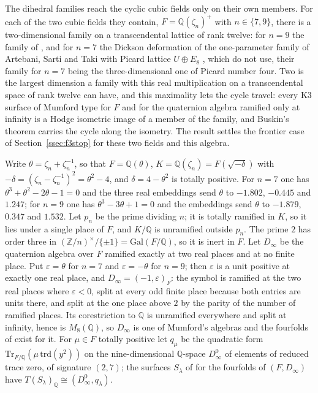 \documentclass[11pt,reqno]{amsart}
\numberwithin{equation}{section}
\theoremstyle{plain}
\theoremstyle{definition}
\newcommand{\QQ}{\mathbb{Q}}
\newcommand{\ZZ}{\mathbb{Z}}
\newcommand{\Gal}{\mathrm{Gal}}
\begin{document}
The dihedral families reach the cyclic cubic fields only on their own members. For each of the two cubic fields they contain, $F=\QQ(\zeta_{n})^{+}$ with $n\in\{7,9\}$, there is a two-dimensional family on a transcendental lattice of rank twelve: for $n=9$ the family of \cite[\S5.6]{vGS25}, and for $n=7$ the Dickson deformation of the one-parameter family of Artebani, Sarti and Taki with Picard lattice $U\oplus E_{8}$ \cite[Ex.~6.1]{AST11}, which \cite{vGS25} do not use, their family for $n=7$ being the three-dimensional one of Picard number four. Two is the largest dimension a family with this real multiplication on a transcendental space of rank twelve can have, and this maximality lets the cycle travel: every K3 surface of Mumford type for $F$ and for the quaternion algebra ramified only at infinity is a Hodge isometric image of a member of the family, and Buskin's theorem carries the cycle along the isometry. The result settles the frontier case of Section~\ref{ssec:f3stop} for these two fields and this algebra.

Write $\theta=\zeta_{n}+\zeta_{n}^{-1}$, so that $F=\QQ(\theta)$, $K=\QQ(\zeta_{n})=F(\sqrt{-\delta})$ with $-\delta=(\zeta_{n}-\zeta_{n}^{-1})^{2}=\theta^{2}-4$, and $\delta=4-\theta^{2}$ is totally positive. For $n=7$ one has $\theta^{3}+\theta^{2}-2\theta-1=0$ and the three real embeddings send $\theta$ to $-1.802$, $-0.445$ and $1.247$; for $n=9$ one has $\theta^{3}-3\theta+1=0$ and the embeddings send $\theta$ to $-1.879$, $0.347$ and $1.532$. Let $p_{n}$ be the prime dividing $n$; it is totally ramified in $K$, so it lies under a single place of $F$, and $K/\QQ$ is unramified outside $p_{n}$. The prime $2$ has order three in $(\ZZ/n)^{\times}/\{\pm1\}=\Gal(F/\QQ)$, so it is inert in $F$. Let $D_{\infty}$ be the quaternion algebra over $F$ ramified exactly at two real places and at no finite place. Put $\varepsilon=\theta$ for $n=7$ and $\varepsilon=-\theta$ for $n=9$; then $\varepsilon$ is a unit positive at exactly one real place, and $D_{\infty}=(-1,\varepsilon)_{F}$: the symbol is ramified at the two real places where $\varepsilon<0$, split at every odd finite place because both entries are units there, and split at the one place above $2$ by the parity of the number of ramified places. Its corestriction to $\QQ$ is unramified everywhere and split at infinity, hence is $M_{8}(\QQ)$, so $D_{\infty}$ is one of Mumford's algebras and the fourfolds of \cite{Mum69} exist for it. For $\mu\in F$ totally positive let $q_{\mu}$ be the quadratic form $\mathrm{Tr}_{F/\QQ}(\mu\,\mathrm{trd}(y^{2}))$ on the nine-dimensional $\QQ$-space $D_{\infty}^{0}$ of elements of reduced trace zero, of signature $(2,7)$; the surfaces $S_{\lambda}$ of \cite[Thm.~21.4]{BMB26} for the fourfolds of $(F,D_{\infty})$ have $T(S_{\lambda})_{\QQ}\cong(D_{\infty}^{0},q_{\lambda})$.
\end{document}
